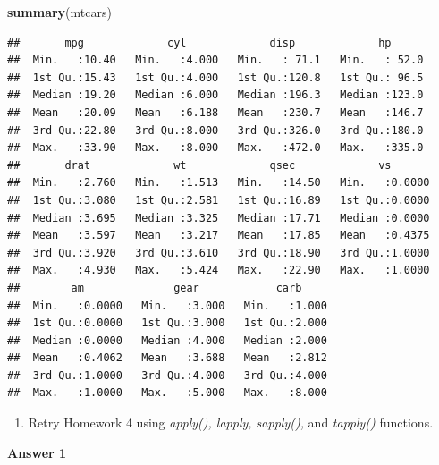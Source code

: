 \documentclass[
]{book}
\newenvironment{Shaded}{\begin{snugshade}}{\end{snugshade}}
\newcommand{\KeywordTok}[1]{\textcolor[rgb]{0.13,0.29,0.53}{\textbf{#1}}}
\newcommand{\NormalTok}[1]{#1}
\providecommand{\tightlist}{%
  \setlength{\itemsep}{0pt}\setlength{\parskip}{0pt}}
\begin{document}
\begin{Shaded}
\begin{Highlighting}[]
\KeywordTok{summary}\NormalTok{(mtcars)}
\end{Highlighting}
\end{Shaded}

\begin{verbatim}
##       mpg             cyl             disp             hp       
##  Min.   :10.40   Min.   :4.000   Min.   : 71.1   Min.   : 52.0  
##  1st Qu.:15.43   1st Qu.:4.000   1st Qu.:120.8   1st Qu.: 96.5  
##  Median :19.20   Median :6.000   Median :196.3   Median :123.0  
##  Mean   :20.09   Mean   :6.188   Mean   :230.7   Mean   :146.7  
##  3rd Qu.:22.80   3rd Qu.:8.000   3rd Qu.:326.0   3rd Qu.:180.0  
##  Max.   :33.90   Max.   :8.000   Max.   :472.0   Max.   :335.0  
##       drat             wt             qsec             vs        
##  Min.   :2.760   Min.   :1.513   Min.   :14.50   Min.   :0.0000  
##  1st Qu.:3.080   1st Qu.:2.581   1st Qu.:16.89   1st Qu.:0.0000  
##  Median :3.695   Median :3.325   Median :17.71   Median :0.0000  
##  Mean   :3.597   Mean   :3.217   Mean   :17.85   Mean   :0.4375  
##  3rd Qu.:3.920   3rd Qu.:3.610   3rd Qu.:18.90   3rd Qu.:1.0000  
##  Max.   :4.930   Max.   :5.424   Max.   :22.90   Max.   :1.0000  
##        am              gear            carb      
##  Min.   :0.0000   Min.   :3.000   Min.   :1.000  
##  1st Qu.:0.0000   1st Qu.:3.000   1st Qu.:2.000  
##  Median :0.0000   Median :4.000   Median :2.000  
##  Mean   :0.4062   Mean   :3.688   Mean   :2.812  
##  3rd Qu.:1.0000   3rd Qu.:4.000   3rd Qu.:4.000  
##  Max.   :1.0000   Max.   :5.000   Max.   :8.000
\end{verbatim}

\begin{enumerate}
\def\labelenumi{\arabic{enumi})}
\setcounter{enumi}{1}
\tightlist
\item
  Retry Homework 4 using \emph{apply(), lapply, sapply(),} and \emph{tapply()} functions.
\end{enumerate}

\newpage

\textbf{Answer 1}
\end{document}
